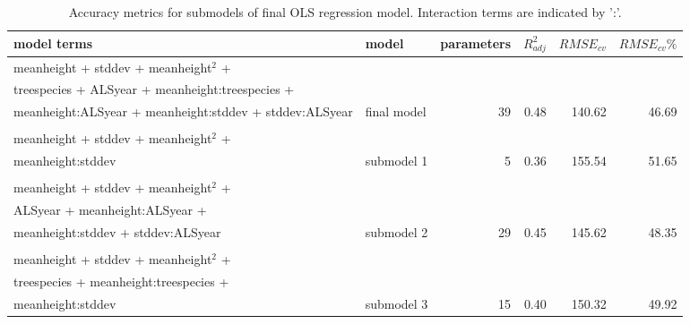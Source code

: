 \begin{table*}[!htbp]
	\centering
	\caption{Accuracy metrics for submodels of final OLS regression model. Interaction terms are indicated by ':'.} 
	\label{tab:modacc_modterms}
	\begin{tabular}{llrrrr}
  \hline
model terms & model & parameters & $R^2_{adj}$ & $RMSE_{cv}$ & $RMSE_{cv}\%$ \\ 
  \hline
  meanheight + stddev + meanheight$^2$ + \\ treespecies + ALSyear + meanheight:treespecies + \\ meanheight:ALSyear + meanheight:stddev + stddev:ALSyear & final model &  39 & 0.48 & 140.62 & 46.69 \\ \\
  meanheight + stddev + meanheight$^2$ + \\ meanheight:stddev & submodel 1 &   5 & 0.36 & 155.54 & 51.65 \\ \\
  meanheight + stddev + meanheight$^2$ + \\ ALSyear + meanheight:ALSyear + \\ meanheight:stddev + stddev:ALSyear & submodel 2 &  29 & 0.45 & 145.62 & 48.35 \\ \\
  meanheight + stddev + meanheight$^2$ + \\ treespecies + meanheight:treespecies + \\ meanheight:stddev & submodel 3 &  15 & 0.40 & 150.32 & 49.92 \\ 
   \hline
\hline
\end{tabular}
\end{table*}


